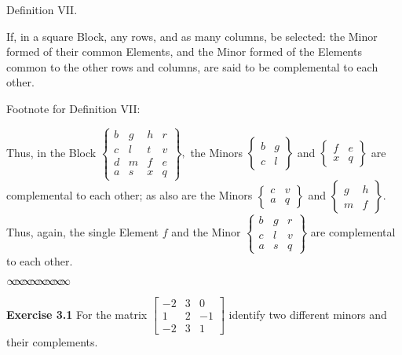 \documentclass[11pt]{article}%
\theoremstyle{definition}
\newcommand{\sep}{\vspace{-3pt} \begin{center}
{\mathversion{normal}
$\infty \mspace{-5.5mu} \infty \mspace{-5.5mu}
\infty \mspace{-5.5mu} \infty \mspace{-5.5mu}
\infty \mspace{-5.5mu} \infty \mspace{-5.5mu}
\infty \mspace{-5.5mu} \infty$}
\end{center} \vspace{-3pt}}
\begin{document}
\begin{center}
\textsf{Definition VII.}
\end{center}

\textsf{If, in a square Block, any rows, and as many columns, be selected: the
Minor formed of their common Elements, and the Minor formed of the Elements
common to the other rows and columns, are said to be complemental to each
other.}

\textsf{Footnote for Definition VII:}

\textsf{Thus, in the Block }$%
\begin{Bmatrix}
b & g & h & r\\
c & l & t & v\\
d & m & f & e\\
a & s & x & q
\end{Bmatrix}
,$\textsf{ the Minors }$%
\begin{Bmatrix}
b & g\\
c & l
\end{Bmatrix}
$ \textsf{and }$%
\begin{Bmatrix}
f & e\\
x & q
\end{Bmatrix}
$ \textsf{are complemental to each other; as also are the Minors }$%
\begin{Bmatrix}
c & v\\
a & q
\end{Bmatrix}
$\textsf{ and }$%
\begin{Bmatrix}
g & h\\
m & f
\end{Bmatrix}
$\textsf{. Thus, again, the single Element }$\mathit{f}$\textsf{ and the Minor
}$%
\begin{Bmatrix}
b & g & r\\
c & l & v\\
a & s & q
\end{Bmatrix}
$\textsf{ are complemental to each other.}%

\sep


\bigskip

\noindent\textbf{Exercise 3.1} For the matrix $%
\begin{bmatrix}
-2 & 3 & 0\\
1 & 2 & -1\\
-2 & 3 & 1
\end{bmatrix}
$ identify two different minors and their complements.

\bigskip
\end{document}
